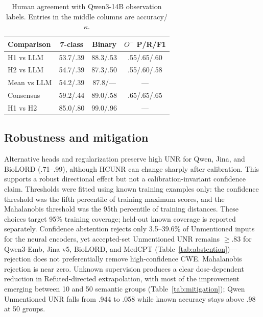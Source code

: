 \documentclass[11pt]{article}
\begin{document}
\begin{table}[t]
  \centering
  \scriptsize
  \setlength{\tabcolsep}{2.2pt}
  \renewcommand{\arraystretch}{1.06}
  \caption{Human agreement with Qwen3-14B observation labels. Entries in
  the middle columns are accuracy/$\kappa$.}
  \label{tab:audit}
  \begin{tabular*}{\columnwidth}{@{\extracolsep{\fill}}lccc@{}}
    \toprule
    \textbf{Comparison} & \textbf{7-class} &
    \textbf{Binary} & \textbf{$O^-$ P/R/F1} \\
    \midrule
    H1 vs LLM   & 53.7/.39 & 88.3/.53 & .55/.65/.60 \\
    H2 vs LLM   & 54.7/.39 & 87.3/.50 & .55/.60/.58 \\
    Mean vs LLM & 54.2/.39 & 87.8/--- & --- \\
    Consensus   & 59.2/.44 & 89.0/.58 & .65/.65/.65 \\
    H1 vs H2    & 85.0/.80 & 99.0/.96 & --- \\
    \bottomrule
  \end{tabular*}
\end{table}


\subsection{Robustness and mitigation}
Alternative heads and regularization preserve high UNR for Qwen, Jina, and
BioLORD (.71--.99), although HCUNR can change sharply after calibration. This
supports a robust directional effect but not a calibration-invariant confidence
claim. Thresholds were fitted using known training examples only: the
confidence threshold was the fifth percentile of training maximum scores, and
the Mahalanobis threshold was the 95th percentile of training distances.
These choices target 95\% training coverage; held-out known coverage is
reported separately. Confidence abstention rejects only 3.5--39.6\% of
Unmentioned inputs for the neural encoders, yet accepted-set Unmentioned UNR
remains $\geq$.83 for Qwen3-Emb, Jina v5, BioLORD, and MedCPT
(Table~\ref{tab:abstention})---rejection does not preferentially remove
high-confidence CWE. Mahalanobis rejection is near zero. Unknown supervision
produces a clear dose-dependent reduction in Refuted-directed extrapolation,
with most of the improvement emerging between 10 and 50 semantic groups
(Table~\ref{tab:mitigation}); Qwen Unmentioned UNR falls from .944 to .058
while known accuracy stays above .98 at 50 groups.
\end{document}
